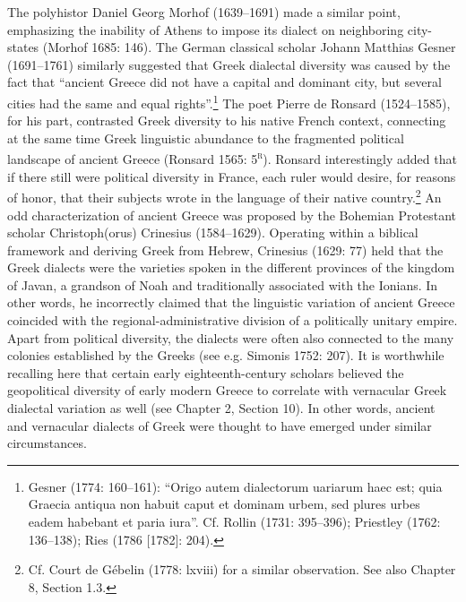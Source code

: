 \begin{styleStandard}
The polyhistor Daniel Georg Morhof (1639–1691) made a similar point, emphasizing the inability of Athens to impose its dialect on neighboring city-states (Morhof 1685: 146). The German classical scholar Johann Matthias Gesner (1691–1761) similarly suggested that Greek dialectal diversity was caused by the fact that “ancient Greece did not have a capital and dominant city, but several cities had the same and equal rights”.\footnote{ Gesner (1774: 160–161): “Origo autem dialectorum uariarum haec est; quia Graecia antiqua non habuit caput et dominam urbem, sed plures urbes eadem habebant et paria iura”. Cf. Rollin (1731: 395–396); Priestley (1762: 136–138); Ries (1786 [1782]: 204).} The poet Pierre de Ronsard (1524–1585), for his part, contrasted Greek diversity to his native French context, connecting at the same time Greek linguistic abundance to the fragmented political landscape of ancient Greece (Ronsard 1565: 5\textsc{\textsuperscript{r}}). Ronsard interestingly added that if there still were political diversity in France, each ruler would desire, for reasons of honor, that their subjects wrote in the language of their native country.\footnote{ Cf. Court de Gébelin (1778: lxviii) for a similar observation. See also Chapter 8, Section 1.3.} An odd characterization of ancient Greece was proposed by the Bohemian Protestant scholar Christoph(orus) Crinesius (1584–1629). Operating within a biblical framework and deriving Greek from Hebrew, Crinesius (1629: 77) held that the Greek dialects were the varieties spoken in the different provinces of the kingdom of Javan, a grandson of Noah and traditionally associated with the Ionians. In other words, he incorrectly claimed that the linguistic variation of ancient Greece coincided with the regional-administrative division of a politically unitary empire. Apart from political diversity, the dialects were often also connected to the many colonies established by the Greeks (see e.g. Simonis 1752: 207). It is worthwhile recalling here that certain early eighteenth-century scholars believed the geopolitical diversity of early modern Greece to correlate with vernacular Greek dialectal variation as well (see Chapter 2, Section 10). In other words, ancient and vernacular dialects of Greek were thought to have emerged under similar circumstances.
\end{styleStandard}

